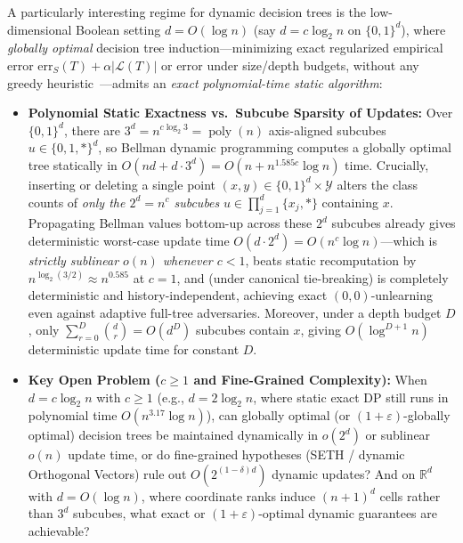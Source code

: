 \documentclass[11pt]{article}
\theoremstyle{definition}
\newcommand{\R}{\mathbb{R}}
\newcommand{\calL}{\mathcal{L}}
\newcommand{\calY}{\mathcal{Y}}
\newcommand{\poly}{\operatorname{poly}}
\begin{document}
A particularly interesting regime for dynamic decision trees is the low-dimensional Boolean setting $d = O(\log n)$ (say $d = c \log_2 n$ on $\{0,1\}^d$), where \emph{globally optimal} decision tree induction---minimizing exact regularized empirical error $\mathrm{err}_S(T) + \alpha |\calL(T)|$ or error under size/depth budgets, without any greedy heuristic~\cite{lin2020generalized}---admits an \emph{exact polynomial-time static algorithm}:
\begin{itemize}[leftmargin=1.5em,itemsep=2pt]
    \item \textbf{Polynomial Static Exactness vs.\ Subcube Sparsity of Updates:} Over $\{0,1\}^d$, there are $3^d = n^{c \log_2 3} = \poly(n)$ axis-aligned subcubes $u \in \{0, 1, *\}^d$, so Bellman dynamic programming computes a globally optimal tree statically in $O(nd + d \cdot 3^d) = O(n + n^{1.585 c}\log n)$ time. Crucially, inserting or deleting a single point $(x, y) \in \{0,1\}^d \times \calY$ alters the class counts of \emph{only the $2^d = n^c$ subcubes} $u \in \prod_{j=1}^d \{x_j, *\}$ containing $x$. Propagating Bellman values bottom-up across these $2^d$ subcubes already gives deterministic worst-case update time $O(d \cdot 2^d) = O(n^c \log n)$---which is \emph{strictly sublinear $o(n)$ whenever $c < 1$}, beats static recomputation by $n^{\log_2(3/2)} \approx n^{0.585}$ at $c = 1$, and (under canonical tie-breaking) is completely deterministic and history-independent, achieving exact $(0,0)$-unlearning even against adaptive full-tree adversaries. Moreover, under a depth budget $D$, only $\sum_{r=0}^D \binom{d}{r} = O(d^D)$ subcubes contain $x$, giving $O(\log^{D+1} n)$ deterministic update time for constant $D$.
    \item \textbf{Key Open Problem ($c \ge 1$ and Fine-Grained Complexity):} When $d = c \log_2 n$ with $c \ge 1$ (e.g., $d = 2\log_2 n$, where static exact DP still runs in polynomial time $O(n^{3.17}\log n)$), can globally optimal (or $(1+\varepsilon)$-globally optimal) decision trees be maintained dynamically in $o(2^d)$ or sublinear $o(n)$ update time, or do fine-grained hypotheses (SETH / dynamic Orthogonal Vectors) rule out $O(2^{(1-\delta)d})$ dynamic updates? And on $\R^d$ with $d = O(\log n)$, where coordinate ranks induce $(n+1)^d$ cells rather than $3^d$ subcubes, what exact or $(1+\varepsilon)$-optimal dynamic guarantees are achievable?
\end{itemize}
\end{document}
